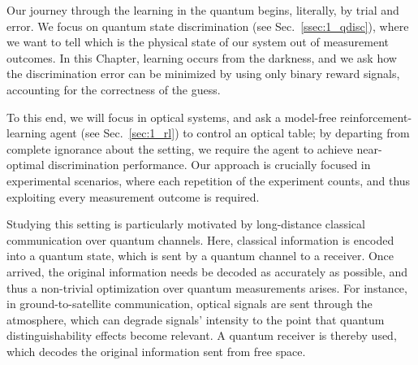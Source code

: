 Our journey through the learning in the quantum begins, literally, by trial and error. We focus on quantum state discrimination (see Sec.~\ref{ssec:1_qdisc}), where we want to tell which is the physical state of our system out of measurement outcomes. In this Chapter, learning occurs from the darkness, and we ask how the discrimination error can be minimized by using only binary reward signals, accounting for the correctness of the guess.

To this end, we will focus in optical systems, and ask a model-free reinforcement-learning agent (see Sec.~\ref{sec:1_rl}) to control an optical table; by departing from complete ignorance about the setting, we require the agent to achieve near-optimal discrimination performance. Our approach is crucially focused in experimental scenarios, where each repetition of the experiment counts, and thus exploiting every measurement outcome is required.

Studying this setting is particularly motivated by long-distance classical communication over quantum channels. Here, classical information is encoded into a quantum state, which is sent by a quantum channel to a receiver. Once arrived, the original information needs be decoded as accurately as possible, and thus a non-trivial optimization over quantum measurements arises. For instance, in ground-to-satellite communication, optical signals are sent through the atmosphere, which can degrade signals' intensity to the point that quantum distinguishability effects become relevant. A quantum receiver is thereby used, which decodes the original information sent from free space. %

